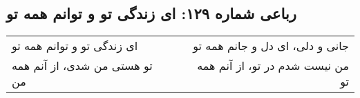 \begin{center}
\section*{رباعی شماره ۱۲۹: ای زندگی تو و توانم همه تو}
\label{sec:129}
\begin{longtable}{l p{0.5cm} r}
ای زندگی تو و توانم همه تو
&&
جانی و دلی، ای دل و جانم همه تو
\\
تو هستی من شدی، از آنم همه من
&&
من نیست شدم در تو، از آنم همه تو
\\
\end{longtable}
\end{center}
